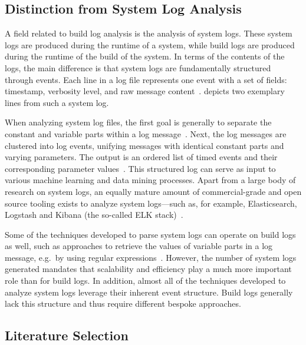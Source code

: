 \documentclass[10pt,journal,compsoc]{IEEEtran}
\begin{document}
\subsection{Distinction from System Log Analysis}
\label{sec:system-log-analysis}

A field related to build log analysis is the analysis of system logs.
These system logs are produced during the runtime of a system, while
build logs are produced during the runtime of the build of the system.
In terms of the contents of the logs, the main difference is that system
logs are fundamentally structured
through events.
Each line in a log file represents one event with a
set of fields: timestamp, verbosity level, and raw message
content~\cite{he2017towards}.
 depicts two
exemplary lines from such a system log.

When analyzing system log files, the first goal is generally to
separate the constant and variable parts within a log
message~\cite{nagappan2010abstracting,he2017towards}.
Next, the log
messages are clustered into log events, unifying messages with
identical constant parts and varying parameters.
The output is an
ordered list of timed events and their corresponding parameter
values~\cite{he2016evaluation}.
This structured log can serve as
input to various machine learning and data mining processes.
Apart
from a large body of research on system logs, an equally mature amount
of commercial-grade and
open source tooling exists to analyze system logs---such as, for
example, Elasticsearch, Logstash and Kibana (the so-called ELK
stack)~\cite{sanjappa2017analysis,bajer2017building}.

Some of the techniques developed to parse system logs can operate
on build logs as well, such as approaches to retrieve the
values of variable parts in a log message, e.g.\, by using regular
expressions~\cite{nagappan2010abstracting,xu2009detecting}.
However, the number of
system logs generated mandates that scalability and efficiency play a
much more important role than for build logs.
In addition, almost all of the techniques developed to analyze system logs
leverage their inherent event structure.
Build logs generally lack this
structure and thus require different bespoke approaches.

\subsection{Literature Selection}
\label{sec:litsel}
\end{document}
